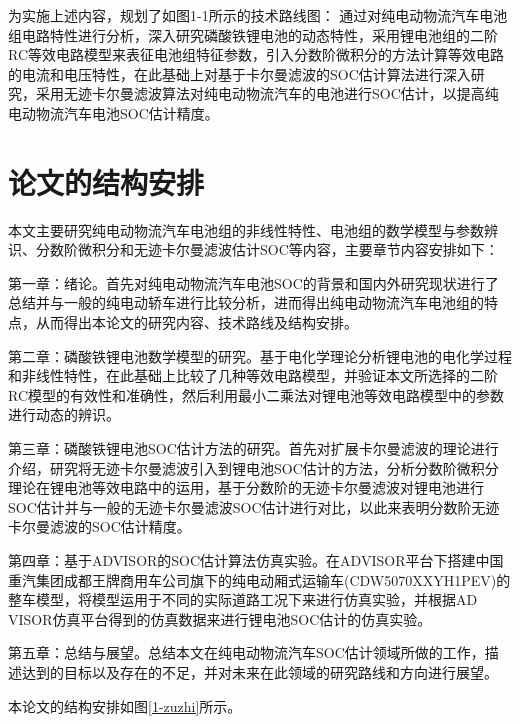 为实施上述内容，规划了如图1-1所示的技术路线图：
通过对纯电动物流汽车电池组电路特性进行分析，深入研究磷酸铁锂电池的动态特性，采用锂电池组的二阶RC等效电路模型来表征电池组特征参数，引入分数阶微积分的方法计算等效电路的电流和电压特性，在此基础上对基于卡尔曼滤波的SOC估计算法进行深入研究，采用无迹卡尔曼滤波算法对纯电动物流汽车的电池进行SOC估计，以提高纯电动物流汽车电池SOC估计精度。
\section{论文的结构安排}
本文主要研究纯电动物流汽车电池组的非线性特性、电池组的数学模型与参数辨识、分数阶微积分和无迹卡尔曼滤波估计SOC等内容，主要章节内容安排如下：

第一章：绪论。首先对纯电动物流汽车电池SOC的背景和国内外研究现状进行了总结并与一般的纯电动轿车进行比较分析，进而得出纯电动物流汽车电池组的特点，从而得出本论文的研究内容、技术路线及结构安排。

第二章：磷酸铁锂电池数学模型的研究。基于电化学理论分析锂电池的电化学过程和非线性特性，在此基础上比较了几种等效电路模型，并验证本文所选择的二阶RC模型的有效性和准确性，然后利用最小二乘法对锂电池等效电路模型中的参数进行动态的辨识。

第三章：磷酸铁锂电池SOC估计方法的研究。首先对扩展卡尔曼滤波的理论进行介绍，研究将无迹卡尔曼滤波引入到锂电池SOC估计的方法，分析分数阶微积分理论在锂电池等效电路中的运用，基于分数阶的无迹卡尔曼滤波对锂电池进行SOC估计并与一般的无迹卡尔曼滤波SOC估计进行对比，以此来表明分数阶无迹卡尔曼滤波的SOC估计精度。

第四章：基于ADVISOR的SOC估计算法仿真实验。在ADVISOR平台下搭建中国重汽集团成都王牌商用车公司旗下的纯电动厢式运输车(CDW5070XXYH1PE\linebreak{}V)的整车模型，将模型运用于不同的实际道路工况下来进行仿真实验，并根据AD\\VISOR仿真平台得到的仿真数据来进行锂电池SOC估计的仿真实验。

第五章：总结与展望。总结本文在纯电动物流汽车SOC估计领域所做的工作，描述达到的目标以及存在的不足，并对未来在此领域的研究路线和方向进行展望。

本论文的结构安排如图\ref{1-zuzhi}所示。
	

	
	

